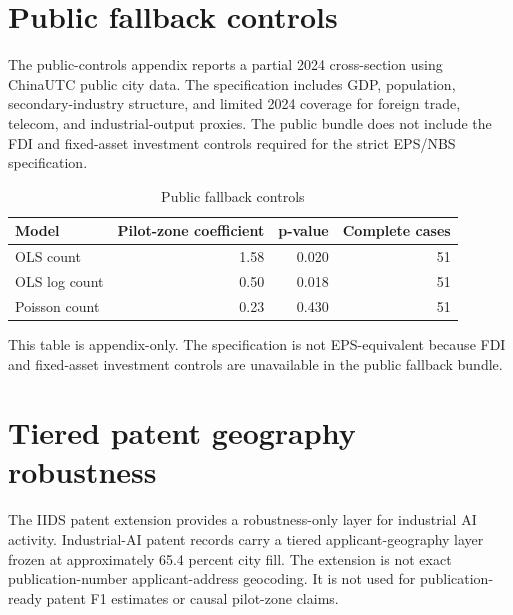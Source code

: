 \documentclass[12pt]{article}
\begin{document}
\section{Public fallback controls}
\label{app:public_controls}

The public-controls appendix reports a partial 2024 cross-section using ChinaUTC public city data. The specification includes GDP, population, secondary-industry structure, and limited 2024 coverage for foreign trade, telecom, and industrial-output proxies. The public bundle does not include the FDI and fixed-asset investment controls required for the strict EPS/NBS specification.

\begin{table}[h!]
\centering
\caption{Public fallback controls}
\label{tab:public_controls}
\begin{threeparttable}
\begin{tabular}{lrrr}
\toprule
Model & Pilot-zone coefficient & p-value & Complete cases \\
\midrule
OLS count & 1.58 & 0.020 & 51 \\
OLS log count & 0.50 & 0.018 & 51 \\
Poisson count & 0.23 & 0.430 & 51 \\
\bottomrule
\end{tabular}
\begin{tablenotes}
\item This table is appendix-only. The specification is not EPS-equivalent because FDI and fixed-asset investment controls are unavailable in the public fallback bundle.
\end{tablenotes}
\end{threeparttable}
\end{table}

\section{Tiered patent geography robustness}
\label{app:patents}

The IIDS patent extension provides a robustness-only layer for industrial AI activity. Industrial-AI patent records carry a tiered applicant-geography layer frozen at approximately 65.4 percent city fill. The extension is not exact publication-number applicant-address geocoding. It is not used for publication-ready patent F1 estimates or causal pilot-zone claims.
\end{document}
